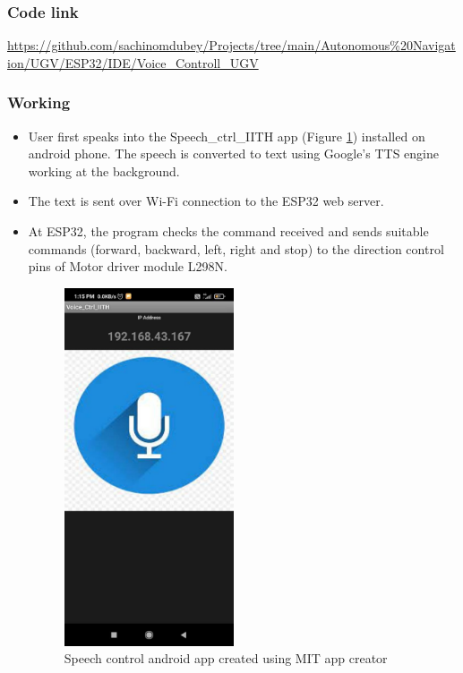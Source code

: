 \subsubsection{Code link} \label{Code_link_UGV_speech}
\begin{tcolorbox}
\url{https://github.com/sachinomdubey/Projects/tree/main/Autonomous\%20Navigation/UGV/ESP32/IDE/Voice_Controll_UGV}
\end{tcolorbox}



\subsubsection{Working}
\begin{itemize}
    \item User first speaks into the Speech\_ctrl\_IITH app (Figure \ref{Speech control app}) installed on android phone. The speech is converted to text using Google's TTS engine working at the background. 
    \item The text is sent over Wi-Fi connection to the ESP32 web server. 
    \item At ESP32, the program checks the command received and sends suitable commands (forward, backward, left, right and stop) to the direction control pins of Motor driver module L298N.
    \begin{figure}[H]
    \centering
    \includegraphics[width=5cm]{./Figures/Speech_ctrl_IITH.jpg}
    \caption{Speech control android app created using MIT app creator}
    \label{Speech control app}
    \end{figure}
\end{itemize}

